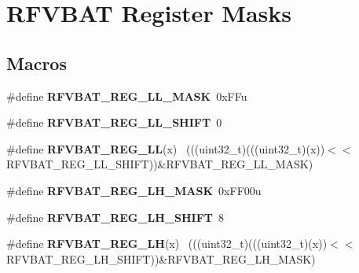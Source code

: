\hypertarget{group___r_f_v_b_a_t___register___masks}{}\section{R\+F\+V\+B\+A\+T Register Masks}
\label{group___r_f_v_b_a_t___register___masks}
\subsection*{Macros}
\begin{DoxyCompactItemize}
\item 
\hypertarget{group___r_f_v_b_a_t___register___masks_gac055aaeebf0ff5200e7b3703d6a6ed73}{}\#define {\bfseries R\+F\+V\+B\+A\+T\+\_\+\+R\+E\+G\+\_\+\+L\+L\+\_\+\+M\+A\+S\+K}~0x\+F\+Fu\label{group___r_f_v_b_a_t___register___masks_gac055aaeebf0ff5200e7b3703d6a6ed73}

\item 
\hypertarget{group___r_f_v_b_a_t___register___masks_ga77fdef5edef0e9e20236761366ed3fbb}{}\#define {\bfseries R\+F\+V\+B\+A\+T\+\_\+\+R\+E\+G\+\_\+\+L\+L\+\_\+\+S\+H\+I\+F\+T}~0\label{group___r_f_v_b_a_t___register___masks_ga77fdef5edef0e9e20236761366ed3fbb}

\item 
\hypertarget{group___r_f_v_b_a_t___register___masks_ga113d3d8df5cf04d594707c9a9df4ea8c}{}\#define {\bfseries R\+F\+V\+B\+A\+T\+\_\+\+R\+E\+G\+\_\+\+L\+L}(x)                                              ~(((uint32\+\_\+t)(((uint32\+\_\+t)(x))$<$$<$R\+F\+V\+B\+A\+T\+\_\+\+R\+E\+G\+\_\+\+L\+L\+\_\+\+S\+H\+I\+F\+T))\&R\+F\+V\+B\+A\+T\+\_\+\+R\+E\+G\+\_\+\+L\+L\+\_\+\+M\+A\+S\+K)\label{group___r_f_v_b_a_t___register___masks_ga113d3d8df5cf04d594707c9a9df4ea8c}

\item 
\hypertarget{group___r_f_v_b_a_t___register___masks_gaac2f9a56be08c02d917e25d2160bb25d}{}\#define {\bfseries R\+F\+V\+B\+A\+T\+\_\+\+R\+E\+G\+\_\+\+L\+H\+\_\+\+M\+A\+S\+K}~0x\+F\+F00u\label{group___r_f_v_b_a_t___register___masks_gaac2f9a56be08c02d917e25d2160bb25d}

\item 
\hypertarget{group___r_f_v_b_a_t___register___masks_ga274af8b911ddd78c1ce6df899ad83cbd}{}\#define {\bfseries R\+F\+V\+B\+A\+T\+\_\+\+R\+E\+G\+\_\+\+L\+H\+\_\+\+S\+H\+I\+F\+T}~8\label{group___r_f_v_b_a_t___register___masks_ga274af8b911ddd78c1ce6df899ad83cbd}

\item 
\hypertarget{group___r_f_v_b_a_t___register___masks_ga551abab9c745a2fdca59aa0f68abef21}{}\#define {\bfseries R\+F\+V\+B\+A\+T\+\_\+\+R\+E\+G\+\_\+\+L\+H}(x)                                              ~(((uint32\+\_\+t)(((uint32\+\_\+t)(x))$<$$<$R\+F\+V\+B\+A\+T\+\_\+\+R\+E\+G\+\_\+\+L\+H\+\_\+\+S\+H\+I\+F\+T))\&R\+F\+V\+B\+A\+T\+\_\+\+R\+E\+G\+\_\+\+L\+H\+\_\+\+M\+A\+S\+K)\label{group___r_f_v_b_a_t___register___masks_ga551abab9c745a2fdca59aa0f68abef21}


\end{DoxyCompactItemize}
